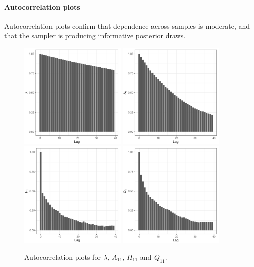 \paragraph{Autocorrelation plots} Autocorrelation plots confirm that dependence across samples is moderate, and that the sampler is producing informative posterior draws.

\begin{figure}[h!]
    \centering
    \includegraphics[width=0.45\textwidth]{../figures/acf_lambda.png}
    \includegraphics[width=0.45\textwidth]{../figures/acf_A11.png}
    \includegraphics[width=0.45\textwidth]{../figures/acf_H11.png}
    \includegraphics[width=0.45\textwidth]{../figures/acf_Q11.png}
    \caption{Autocorrelation plots for $\lambda$, $A_{11}$, $H_{11}$ and $Q_{11}$.}
\end{figure}

